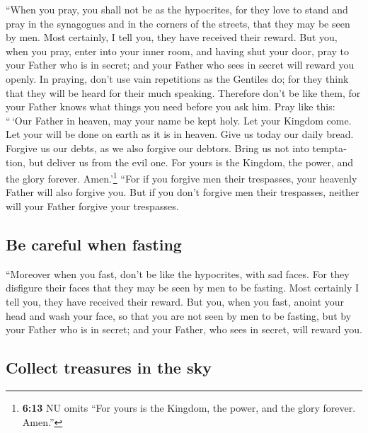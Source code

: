 \begin{paracol}{2}
\begin{otherlanguage}{english}
 ``When you pray, you shall not be as the hypocrites, for
they love to stand and pray in the synagogues and in the corners of the
streets, that they may be seen by men. Most certainly, I tell you, they
have received their reward.  But you, when you pray, enter
into your inner room, and having shut your door, pray to your Father who
is in secret; and your Father who sees in secret will reward you openly.
 In praying, don't use vain repetitions as the Gentiles
do; for they think that they will be heard for their much speaking.
 Therefore don't be like them, for your Father knows what
things you need before you ask him.  Pray like this:
``\,`Our Father in heaven, may your name be kept holy. 
Let your Kingdom come. Let your will be done on earth as it is in
heaven.  Give us today our daily bread. 
Forgive us our debts, as we also forgive our debtors. 
Bring us not into temptation, but deliver us from the evil one. For
yours is the Kingdom, the power, and the glory forever.
Amen.'\footnote{\textbf{6:13} NU omits ``For yours is the Kingdom, the
  power, and the glory forever. Amen.''}  ``For if you
forgive men their trespasses, your heavenly Father will also forgive
you.  But if you don't forgive men their trespasses,
neither will your Father forgive your trespasses.

\hypertarget{be-careful-when-fasting}{%
\subsection{Be careful when fasting}\label{be-careful-when-fasting}}

 ``Moreover when you fast, don't be like the hypocrites,
with sad faces. For they disfigure their faces that they may be seen by
men to be fasting. Most certainly I tell you, they have received their
reward.  But you, when you fast, anoint your head and
wash your face,  so that you are not seen by men to be
fasting, but by your Father who is in secret; and your Father, who sees
in secret, will reward you.

\hypertarget{collect-treasures-in-the-sky}{%
\subsection{Collect treasures in the
sky}\label{collect-treasures-in-the-sky}}


\end{otherlanguage}
\end{paracol}
